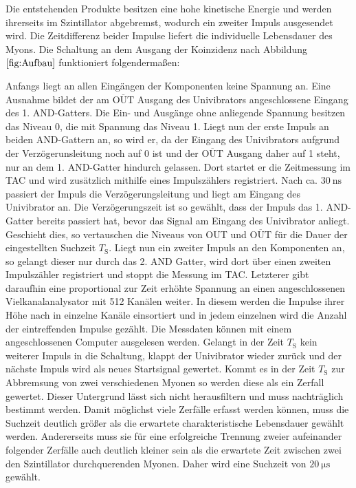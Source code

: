     Die entstehenden Produkte besitzen eine hohe kinetische Energie und werden ihrerseits im Szintillator abgebremst, wodurch ein zweiter Impuls ausgesendet wird. Die Zeitdifferenz beider Impulse liefert die individuelle Lebensdauer des Myons. Die Schaltung an dem Ausgang der Koinzidenz nach Abbildung $ \ref{fig:Aufbau}$ funktioniert folgendermaßen:

    Anfangs liegt an allen Eingängen der Komponenten keine Spannung an. Eine Ausnahme bildet der am $\overline{\text{OUT}}$ Ausgang des Univibrators angeschlossene Eingang des 1. AND-Gatters. Die Ein- und Ausgänge ohne anliegende Spannung besitzen das Niveau 0, die mit Spannung das Niveau 1. 
    Liegt nun der erste Impuls an beiden AND-Gattern an, so wird er, da der Eingang des Univibrators aufgrund der Verzögerunsleitung noch auf 0 ist und der $\overline{\text{OUT}}$ Ausgang daher auf 1 steht, nur an dem 1. AND-Gatter hindurch gelassen. Dort startet er die Zeitmessung im TAC und wird zusätzlich mithilfe eines Impulszählers registriert. Nach ca. $\SI{30}{\nano\second}$ passiert der Impuls die Verzögerungsleitung und liegt am Eingang des Univibrator an. Die Verzögerungszeit ist so gewählt, dass der Impuls das 1. AND-Gatter bereits passiert hat, bevor das Signal am Eingang des Univibrator anliegt. Geschieht dies, so vertauschen die Niveaus von OUT und $\overline{\text{OUT}}$ für die Dauer der eingestellten Suchzeit $T_\text{S}$. Liegt nun ein zweiter Impuls an den Komponenten an, so gelangt dieser nur durch das 2. AND Gatter, wird dort über einen zweiten Impulszähler registriert und stoppt die Messung im TAC. Letzterer gibt daraufhin eine proportional zur Zeit erhöhte Spannung an einen angeschlossenen Vielkanalanalysator mit 512 Kanälen weiter. In diesem werden die Impulse ihrer Höhe nach in einzelne Kanäle einsortiert und in jedem einzelnen wird die Anzahl der eintreffenden Impulse gezählt. Die Messdaten können mit einem angeschlossenen Computer ausgelesen werden. Gelangt in der Zeit $T_\text{S}$ kein weiterer Impuls in die Schaltung, klappt der Univibrator wieder zurück und der nächste Impuls wird als neues Startsignal gewertet. Kommt es in der Zeit $T_\text{S}$ zur Abbremsung von zwei verschiedenen Myonen so werden diese als ein Zerfall gewertet. Dieser Untergrund lässt sich nicht herausfiltern und muss nachträglich bestimmt werden. Damit möglichst viele Zerfälle erfasst werden können, muss die Suchzeit deutlich größer als die erwartete charakteristische Lebensdauer gewählt werden. Andererseits muss sie für eine erfolgreiche Trennung zweier aufeinander folgender Zerfälle auch deutlich kleiner sein als die erwartete Zeit zwischen zwei den Szintillator durchquerenden Myonen. Daher wird eine Suchzeit von $\SI{20}{\micro\second}$ gewählt. 


